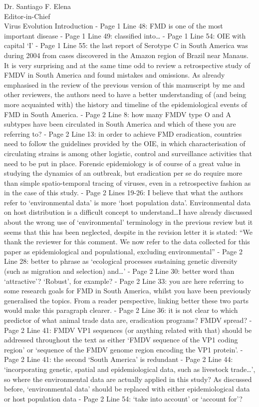 \documentclass[12pt, a4paper]{letter} %
\begin{document}
\begin{letter}{
	Dr. Santiago F. Elena\\
    Editor-in-Chief \\
    Virus Evolution
}
Introduction
-       Page 1 Line 48: FMD is one of the most important disease
-       Page 1 Line 49: classified into…
-       Page 1 Line 54: OIE with capital ‘I’
-       Page 1 Line 55: the last report of Serotype C in South America was during 2004 from cases discovered in the Amazon region of Brazil near Manaus.
It is very surprising and at the same time odd to review a retrospective study of FMDV in South America and found mistakes and omissions.
As already emphasised in the review of the previous version of this manuscript by me and other reviewers, the authors need to have a better understanding of (and being more acquainted with) the history and timeline of the epidemiological events of FMD in South America.
-       Page 2 Line 8: how many FMDV type O and A subtypes have been circulated in South America and which of these you are referring to?
-       Page 2 Line 13: in order to achieve FMD eradication, countries need to follow the guidelines provided by the OIE, in which characterisation of circulating strains is among other logistic, control and surveillance activities that need to be put in place. Forensic epidemiology is of course of a great value in studying the dynamics of an outbreak, but eradication per se do require more than simple spatio-temporal tracing of viruses, even in a retrospective fashion as in the case of this study.
-       Page 2 Lines 19-26: I believe that what the authors refer to ‘environmental data’ is more ‘host population data’. Environmental data on host distribution is a difficult concept to understand…I have already discussed about the wrong use of ‘environmental’ terminology in the previous review but it seems that this has been neglected, despite in the revision letter it is stated: “We thank the reviewer for this comment. We now refer to the data collected for this paper as epidemiological and populational, excluding environmental”
-       Page 2 Line 28: better to phrase as ‘ecological processes sustaining genetic diversity (such as migration and selection) and…’
-       Page 2 Line 30: better word than ‘attractive’? ‘Robust’, for example?
-       Page 2 Line 33: you are here referring to some research goals for FMD in South America, whilst you have been previously generalised the topics. From a reader perspective, linking better these two parts would make this paragraph clearer.
-       Page 2 Line 36: it is not clear to which predictor of what animal trade data are, eradication programs? FMDV spread?
-       Page 2 Line 41: FMDV VP1 sequences (or anything related with that) should be addressed throughout the text as either ‘FMDV sequence of the VP1 coding region’ or ‘sequence of the FMDV genome region encoding the VP1 protein’.
-       Page 2 Line 41: the second ‘South America’ is redundant
-       Page 2 Line 44: ‘incorporating genetic, spatial and epidemiological data, such as livestock trade…’, so where the environmental data are actually applied in this study? As discussed before, ‘environmental data’ should be replaced with either epidemiological data or host population data
-       Page 2 Line 54: ‘take into account’ or ‘account for’?


\end{letter}
\end{document}
